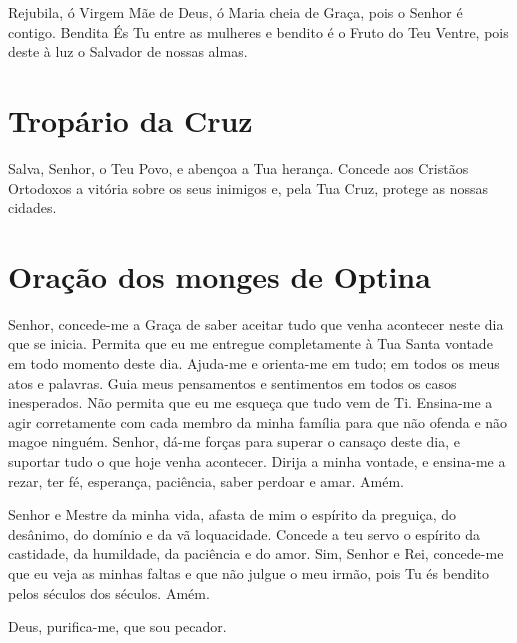 \documentclass{subfiles}
\begin{document}
Rejubila, ó Virgem Mãe de Deus, ó Maria cheia de Graça, pois o Senhor é contigo.
Bendita És Tu entre as mulheres e bendito é o Fruto do Teu Ventre, pois deste à
luz o Salvador de nossas almas.

\section*{Tropário da Cruz}

Salva, Senhor, o Teu Povo, e abençoa a Tua herança. Concede aos Cristãos
Ortodoxos a vitória sobre os seus inimigos e, pela Tua Cruz, protege as nossas
cidades.

\section*{Oração dos monges de Optina}

Senhor, concede-me a Graça de saber aceitar tudo que venha acontecer neste dia
que se inicia. Permita que eu me entregue completamente à Tua Santa vontade em
todo momento deste dia. Ajuda-me e orienta-me em tudo; em todos os meus atos e
palavras. Guia meus pensamentos e sentimentos em todos os casos inesperados. Não
permita que eu me esqueça que tudo vem de Ti. Ensina-me a agir corretamente com
cada membro da minha família para que não ofenda e não magoe ninguém. Senhor,
dá-me forças para superar o cansaço deste dia, e suportar tudo o que hoje venha
acontecer. Dirija a minha vontade, e ensina-me a rezar, ter fé, esperança,
paciência, saber perdoar e amar. Amém.



Senhor e Mestre da minha vida, afasta de mim o espírito da preguiça, do
desânimo, do domínio e da vã loquacidade. Concede a teu servo o espírito da
castidade, da humildade, da paciência e do amor. Sim, Senhor e Rei, concede-me
que eu veja as minhas faltas e que não julgue o meu irmão, pois Tu és bendito
pelos séculos dos séculos. Amém.

Deus, purifica-me, que sou pecador. 


{\begin{center}\end{center}}
\end{document}
